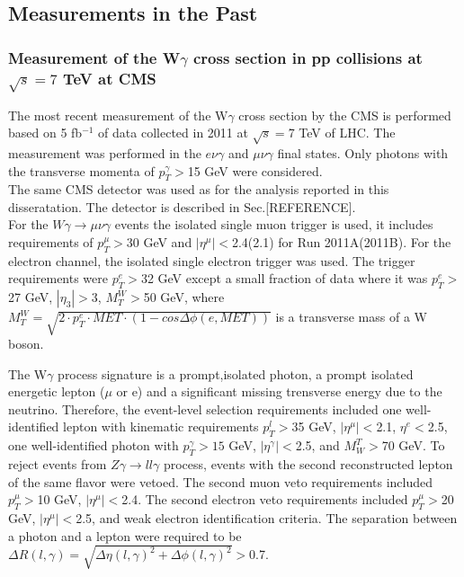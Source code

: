 \subsection{Measurements in the Past}

\subsubsection{Measurement of the W$\gamma$ cross section in pp collisions at $\sqrt{s}=7$ TeV at CMS}

The most recent measurement of the W$\gamma$ cross section by the CMS is performed based on 5 fb$^{-1}$ of data collected in 2011 at $\sqrt{s}=$7 TeV of LHC. The measurement was performed in the $e\nu\gamma$ and $\mu\nu\gamma$ final states. Only photons with the transverse momenta of $p_T^{\gamma}>$15 GeV were considered.\\
The same CMS detector was used as for the analysis reported in this disseratation. The detector is described in Sec.[REFERENCE].\\



For the $W\gamma\rightarrow\mu\nu\gamma$ events the isolated single muon trigger is used, it includes requirements of $p_T^{\mu}>$30 GeV and $|\eta^{\mu}|<$2.4(2.1) for Run 2011A(2011B). 
For the electron channel, the isolated single electron trigger was used. The trigger requirements were $p_T^e>$32 GeV except a small fraction of data where it was $p_T^e>$27 GeV, $|\eta_3|>$3, $M_T^W>$50 GeV, where $M_T^W=\sqrt{2 \cdot p_T^e \cdot MET \cdot (1-cos\Delta\phi(e,MET))}$ is a transverse mass of a W boson.

The W$\gamma$ process signature is a prompt,isolated photon, a prompt isolated energetic lepton ($\mu$ or e) and a significant missing trensverse energy due to the neutrino. Therefore, the event-level selection requirements included one well-identified lepton with kinematic requirements $p_T^l>$35 GeV, $|\eta^\mu|<$2.1, $\eta^e<$2.5, one well-identified photon with $p_T^\gamma>15$ GeV, $|\eta^\gamma|<$2.5, and $M_W^T>$70 GeV. To reject events from $Z\gamma\rightarrow ll\gamma$ process, events with the second reconstructed lepton of the same flavor were vetoed. The second muon veto requirements included $p_T^\mu>$10 GeV, $|\eta^\mu|<$2.4. The second electron veto requirements included $p_T^\mu>$20 GeV, $|\eta^\mu|<$2.5, and weak electron identification criteria. The separation between a photon and a lepton were required to be $\Delta R(l,\gamma) = \sqrt{\Delta \eta(l,\gamma)^2 + \Delta \phi(l,\gamma)^2}>$0.7.\\  

